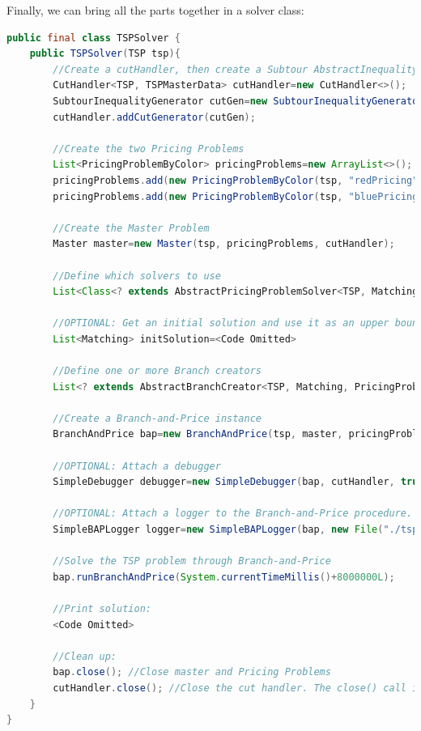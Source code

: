\documentclass[a4paper]{article}
\newenvironment{myblock}[1]{%
    \tcolorbox[beamer,%
    noparskip,breakable,
    colback=lightBlueCodeBlock,colframe=darkBlueCodeBlock,%
    colbacklower=darkBlueCodeBlock!75!lightBlueCodeBlock,%
    coltitle=blueTitleCodeBlock,
    title=#1]}%
    {\endtcolorbox}
\begin{document}
Finally, we can bring all the parts together in a solver class:
\begin{myblock}{TSPSolver}
\begin{lstlisting}[language=java, style=eclipseArticle, xleftmargin=2em]  
public final class TSPSolver {
	public TSPSolver(TSP tsp){
		//Create a cutHandler, then create a Subtour AbstractInequality Generator and add it to the handler
		CutHandler<TSP, TSPMasterData> cutHandler=new CutHandler<>();
		SubtourInequalityGenerator cutGen=new SubtourInequalityGenerator(tsp);
		cutHandler.addCutGenerator(cutGen);

		//Create the two Pricing Problems
		List<PricingProblemByColor> pricingProblems=new ArrayList<>();
		pricingProblems.add(new PricingProblemByColor(tsp, "redPricing", MatchingColor.RED));
		pricingProblems.add(new PricingProblemByColor(tsp, "bluePricing", MatchingColor.BLUE));

		//Create the Master Problem
		Master master=new Master(tsp, pricingProblems, cutHandler);
		
		//Define which solvers to use
		List<Class<? extends AbstractPricingProblemSolver<TSP, Matching, PricingProblemByColor>>> solvers= Collections.singletonList(ExactPricingProblemSolver.class);
		
		//OPTIONAL: Get an initial solution and use it as an upper bound
		List<Matching> initSolution=<Code Omitted>

		//Define one or more Branch creators
		List<? extends AbstractBranchCreator<TSP, Matching, PricingProblemByColor>> branchCreators= Collections.singletonList(new BranchOnEdge(tsp, pricingProblems));

		//Create a Branch-and-Price instance
		BranchAndPrice bap=new BranchAndPrice(tsp, master, pricingProblems, solvers, branchCreators, initObjective, initSolution);

		//OPTIONAL: Attach a debugger
		SimpleDebugger debugger=new SimpleDebugger(bap, cutHandler, true);

		//OPTIONAL: Attach a logger to the Branch-and-Price procedure.
		SimpleBAPLogger logger=new SimpleBAPLogger(bap, new File("./tsp.log"));

		//Solve the TSP problem through Branch-and-Price
		bap.runBranchAndPrice(System.currentTimeMillis()+8000000L);

		//Print solution:
		<Code Omitted>

		//Clean up:
		bap.close(); //Close master and Pricing Problems
		cutHandler.close(); //Close the cut handler. The close() call is propagated to all registered AbstractCutGenerator classes
	}
}
\end{lstlisting}
\end{myblock}
\end{document}
